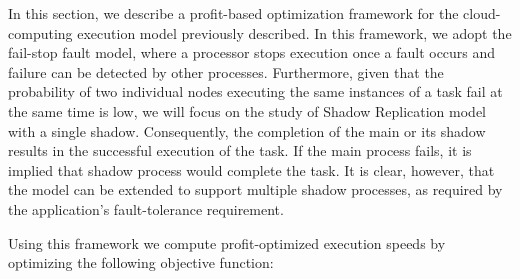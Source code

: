 \noindent 

In this section, we describe a profit-based optimization framework for
the cloud-computing execution model previously described. 
In this framework, we adopt the fail-stop fault model, where a processor stops execution once a fault
occurs and failure can be detected by other processes\cite{gartner_faults_1999,cristian_comm_1991}.
Furthermore, given that the probability of two individual nodes executing the same
instances of a task fail at the same time is low, we will focus on the study of Shadow Replication model with a single shadow.
Consequently, the completion of the main or its shadow results in the successful execution of the task. If the main
process fails, it is implied that shadow process would complete the
task.  It is clear, however, that the model can
be extended to support multiple shadow processes, as required by the
application's fault-tolerance requirement. 

Using this
framework we compute profit-optimized execution speeds by
optimizing the following objective function:







